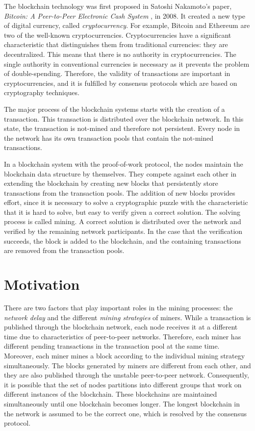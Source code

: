 The blockchain technology was first proposed in Satoshi Nakamoto’s paper, \textit{Bitcoin: A Peer-to-Peer Electronic Cash System} \cite{Nakamoto2008}, in 2008. It created a new type of digital currency, called \textit{cryptocurrency}. For example, Bitcoin \cite{bitcoin} and Ethereum \cite{ethereum} are two of the well-known cryptocurrencies. Cryptocurrencies have a significant characteristic that distinguishes them from traditional currencies: they are decentralized. This means that there is no authority in cryptocurrencies. The single authority in conventional currencies is necessary as it prevents the problem of double-spending. Therefore, the validity of transactions are important in cryptocurrencies, and it is fulfilled by consensus protocols which are based on cryptography techniques. \cite{Narayanan2016}

The major process of the blockchain systems starts with the creation of a transaction. This transaction is distributed over the blockchain network. In this state, the transaction is not-mined and therefore not persistent. Every node in the network has its own transaction pools that contain the not-mined transactions.

In a blockchain system with the proof-of-work protocol, the nodes maintain the blockchain data structure by themselves. They compete against each other in extending the blockchain by creating new blocks that persistently store transactions from the transaction pools. The addition of new blocks provides effort, since it is necessary to solve a cryptographic puzzle with the characteristic that it is hard to solve, but easy to verify given a correct solution. The solving process is called mining. A correct solution is distributed over the network and verified by the remaining network participants. In the case that the verification succeeds, the block is added to the blockchain, and the containing transactions are removed from the transaction pools.

\section{Motivation}

There are two factors that play important roles in the mining processes: the \textit{network delay} and the different \textit{mining strategies} of miners. While a transaction is published through the blockchain network, each node receives it at a different time due to characteristics of peer-to-peer networks. Therefore, each miner has different pending transactions in the transaction pool at the same time. Moreover, each miner mines a block according to the individual mining strategy simultaneously. The blocks generated by miners are different from each other, and they are also published through the unstable peer-to-peer network. Consequently, it is possible that the set of nodes partitions into different groups that work on different instances of the blockchain. These blockchains are maintained simultaneously until one blockchain becomes longer. The longest blockchain in the network is assumed to be the correct one, which is resolved by the consensus protocol.

